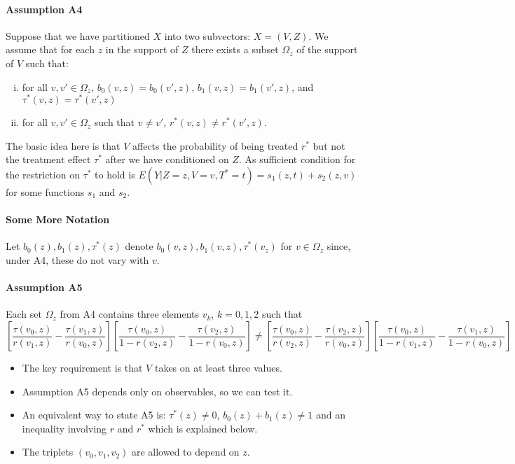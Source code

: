 \documentclass[12pt]{article}
\begin{document}
\paragraph{Assumption A4} Suppose that we have partitioned $X$ into two subvectors: $X = (V,Z)$. 
We assume that for each $z$ in the support of $Z$ there exists a subset $\Omega_z$ of the support of $V$ such that:
\begin{enumerate}[(i)]
  \item for all $v, v'\in \Omega_z$, $b_0(v,z)=b_0(v',z)$, $b_1(v,z)=b_1(v',z)$, and $\tau^*(v,z) = \tau^*(v',z)$
  \item for all $v,v' \in \Omega_z$ such that $v\neq v'$, $r^*(v,z) \neq r^*(v',z)$.
\end{enumerate}
The basic idea here is that $V$ affects the probability of being treated $r^*$ but not the treatment effect $\tau^*$ after we have conditioned on $Z$.
As sufficient condition for the restriction on $\tau^*$ to hold is $E(Y|Z=z,V=v,T^*=t) = s_1(z,t) + s_2(z,v)$ for some functions $s_1$ and $s_2$.

\paragraph{Some More Notation} Let $b_0(z), b_1(z), \tau^*(z)$ denote $b_0(v,z), b_1(v,z), \tau^*(v_z)$ for $v \in \Omega_z$ since, under A4, these do not vary with $v$.

\paragraph{Assumption A5} Each set $\Omega_z$ from A4 contains three elements $v_k$, $k=0,1,2$ such that
\[
  \left[ \frac{\tau(v_0,z)}{r(v_1,z)} - \frac{\tau(v_1,z)}{r(v_0,z)} \right]\left[ \frac{\tau(v_0,z)}{1 - r(v_2,z)} - \frac{\tau(v_2,z)}{1 - r(v_0,z)} \right] \neq 
  \left[ \frac{\tau(v_0,z)}{r(v_2,z)} - \frac{\tau(v_2,z)}{r(v_0,z)} \right]\left[ \frac{\tau(v_0,z)}{1 - r(v_1,z)} - \frac{\tau(v_1,z)}{1 - r(v_0,z)} \right] 
\]
\begin{itemize}
  \item The key requirement is that $V$ takes on at least three values.
  \item Assumption A5 depends only on observables, so we can test it.
  \item An equivalent way to state A5 is: $\tau^*(z)\neq 0$, $b_0(z)+b_1(z) \neq 1$ and an inequality involving $r$ and $r^*$ which is explained below.
  \item The triplets $(v_0, v_1, v_2)$ are allowed to depend on $z$.
\end{itemize}
\end{document}
